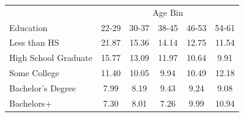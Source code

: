 \begin{tabular}{lccccc}
\hline\hline
 & \multicolumn{5}{c}{Age Bin} \\
Education & 22-29 & 30-37 & 38-45 & 46-53 & 54-61 \\
\hline
Less than HS&21.87&15.36&14.14&12.75&11.54\\
High School Graduate&15.77&13.09&11.97&10.64&9.91\\
Some College&11.40&10.05&9.94&10.49&12.18\\
Bachelor's Degree&7.99&8.19&9.43&9.24&9.08\\
Bachelors+&7.30&8.01&7.26&9.99&10.94\\
\hline\hline
\end{tabular}
